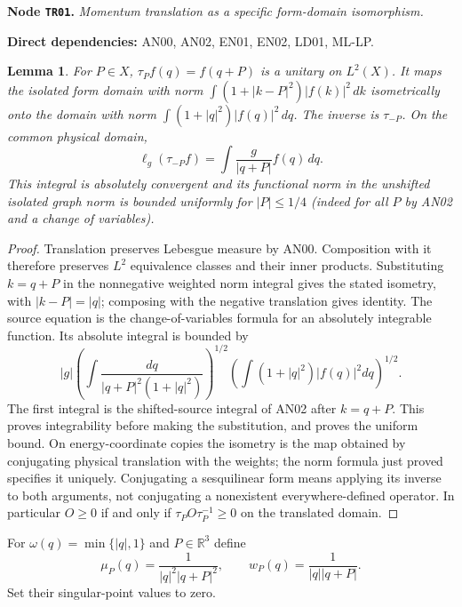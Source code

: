 \documentclass[11pt,a4paper]{article}
\newtheorem{lemma}[theorem]{Lemma}
\theoremstyle{remark}\newtheorem{remark}[theorem]{Remark}
\newcommand{\R}{\mathbb R}\newcommand{\C}{\mathbb C}\newcommand{\N}{\mathbb N}
\newcommand{\abs}[1]{\lvert #1\rvert}\newcommand{\rankone}[2]{\lvert #1\rangle\langle #2\rvert}
\newcommand{\node}[3]{\par\Needspace{6\baselineskip}\smallskip\hypertarget{node:#1}{}\label{nodepage:#1}\noindent\textbf{Node \texttt{#1}.} \textit{#2.}\par\noindent\textbf{Direct dependencies:} #3.\par}
\begin{document}
\node{TR01}{Momentum translation as a specific form-domain isomorphism}{AN00, AN02, EN01, EN02, LD01, ML-LP}
\begin{lemma}\label{lem:translationadapter}
For $P\in X$, $\tau_Pf(q)=f(q+P)$ is a unitary on $L^2(X)$. It maps the isolated form domain with norm $\int(1+|k-P|^2)|f(k)|^2\,dk$ isometrically onto the domain with norm $\int(1+|q|^2)|f(q)|^2\,dq$. The inverse is $\tau_{-P}$. On the common physical domain,
\[
 \ell_g(\tau_{-P}f)=\int\frac{g}{|q+P|}f(q)\,dq.
\]
This integral is absolutely convergent and its functional norm in the unshifted isolated graph norm is bounded uniformly for $|P|\leq1/4$ (indeed for all $P$ by AN02 and a change of variables).
\end{lemma}
\begin{proof}
Translation preserves Lebesgue measure by AN00. Composition with it therefore preserves $L^2$ equivalence classes and their inner products. Substituting $k=q+P$ in the nonnegative weighted norm integral gives the stated isometry, with $|k-P|=|q|$; composing with the negative translation gives identity. The source equation is the change-of-variables formula for an absolutely integrable function. Its absolute integral is bounded by
\[
 |g|\left(\int\frac{dq}{|q+P|^2(1+|q|^2)}\right)^{1/2}
       \left(\int(1+|q|^2)|f(q)|^2dq\right)^{1/2}.
\]
The first integral is the shifted-source integral of AN02 after $k=q+P$. This proves integrability before making the substitution, and proves the uniform bound. On energy-coordinate copies the isometry is the map obtained by conjugating physical translation with the weights; the norm formula just proved specifies it uniquely. Conjugating a sesquilinear form means applying its inverse to both arguments, not conjugating a nonexistent everywhere-defined operator. In particular $O\geq0$ if and only if $\tau_PO\tau_P^{-1}\geq0$ on the translated domain.
\end{proof}

For $\omega(q)=\min\{\abs q,1\}$ and $P\in\R^3$ define
\[
 \mu_P(q)=\frac1{\abs q^2\abs{q+P}^2},\qquad
 w_P(q)=\frac1{\abs q\abs{q+P}}.
\]
Set their singular-point values to zero.
\end{document}
